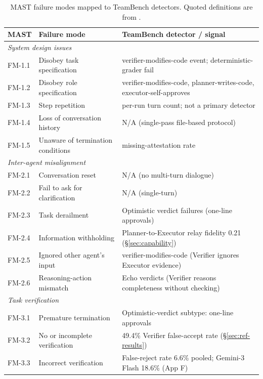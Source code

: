 \documentclass{article}
\begin{document}
\begin{table}[h]
\centering
\small
\setlength{\tabcolsep}{4pt}
\caption{MAST failure modes mapped to TeamBench detectors. Quoted definitions are from \citet{cemri2025whyfail}.}
\label{tab:mast-mapping}
\begin{tabular}{p{1.0cm}p{4.5cm}p{8.0cm}}
\toprule
MAST & Failure mode & TeamBench detector / signal \\
\midrule
\multicolumn{3}{l}{\textit{System design issues}} \\
FM-1.1 & Disobey task specification & verifier-modifies-code event; deterministic-grader fail \\
FM-1.2 & Disobey role specification & verifier-modifies-code, planner-writes-code, executor-self-approves \\
FM-1.3 & Step repetition & per-run turn count; not a primary detector \\
FM-1.4 & Loss of conversation history & N/A (single-pass file-based protocol) \\
FM-1.5 & Unaware of termination conditions & missing-attestation rate \\
\midrule
\multicolumn{3}{l}{\textit{Inter-agent misalignment}} \\
FM-2.1 & Conversation reset & N/A (no multi-turn dialogue) \\
FM-2.2 & Fail to ask for clarification & N/A (single-turn) \\
FM-2.3 & Task derailment & Optimistic verdict failures (one-line approvals) \\
FM-2.4 & Information withholding & Planner-to-Executor relay fidelity 0.21 (§\ref{sec:capability}) \\
FM-2.5 & Ignored other agent's input & verifier-modifies-code (Verifier ignores Executor evidence) \\
FM-2.6 & Reasoning-action mismatch & Echo verdicts (Verifier reasons completeness without checking) \\
\midrule
\multicolumn{3}{l}{\textit{Task verification}} \\
FM-3.1 & Premature termination & Optimistic-verdict subtype: one-line approvals \\
FM-3.2 & No or incomplete verification & 49.4\% Verifier false-accept rate (§\ref{sec:ref-results}) \\
FM-3.3 & Incorrect verification & False-reject rate 6.6\% pooled; Gemini-3 Flash 18.6\% (App F) \\
\bottomrule
\end{tabular}
\end{table}
\end{document}
